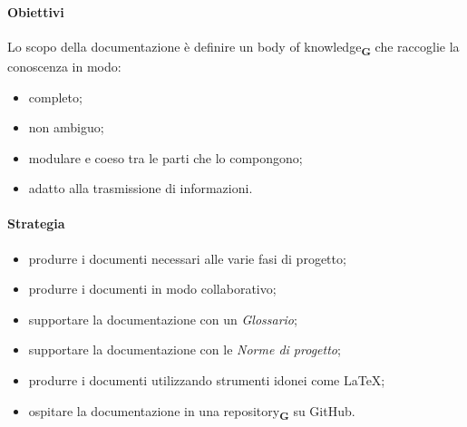 \paragraph{Obiettivi}
Lo scopo della documentazione è definire un body of knowledge\textsubscript{\textbf{G}} che raccoglie la conoscenza in modo:
\begin{itemize}
    \item completo;
    \item non ambiguo;
    \item modulare e coeso tra le parti che lo compongono;
    \item adatto alla trasmissione di informazioni.
\end{itemize}
\paragraph{Strategia}
\begin{itemize}
    \item produrre i documenti necessari alle varie fasi di progetto;
    \item produrre i documenti in modo collaborativo;
    \item supportare la documentazione con un \textit{Glossario};
    \item supportare la documentazione con le \textit{Norme di progetto};
    \item produrre i documenti utilizzando strumenti idonei come LaTeX;
    \item ospitare la documentazione in una repository\textsubscript{\textbf{G}} su GitHub.
\end{itemize}
